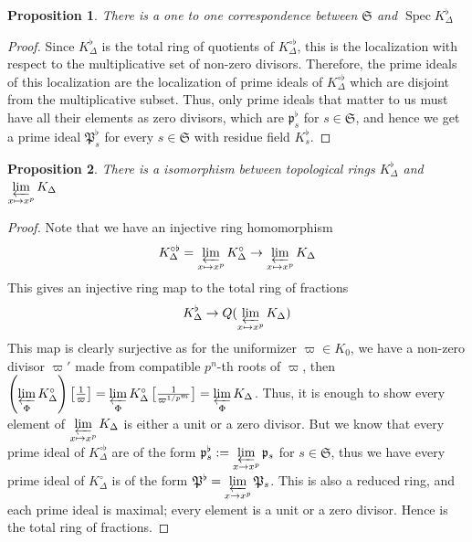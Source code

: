 \documentclass[12pts,a4paper]{amsart}
\newtheorem{proposition}{Proposition}[section]
\DeclareMathOperator{\spec}{Spec}
\begin{document}
\begin{proposition}
    There is a one to one correspondence between $\mathfrak{S}$ and $\spec K^\flat_\Delta$
\end{proposition}

\begin{proof}
    Since $K^\flat_\Delta$ is the total ring of quotients of $K^{\circ\flat}_\Delta$, this is the localization with respect to the multiplicative set of non-zero divisors. Therefore, the prime ideals of this localization are the localization of prime ideals of $K^{\circ\flat}_\Delta$ which are disjoint from the multiplicative subset. Thus, only prime ideals that matter to us must have all their elements as zero divisors, which are $\mathfrak{p}^\flat_s$ for $s\in\mathfrak{S}$, and hence we get a prime ideal  $\mathfrak{P}^\flat_s$ for every $s\in\mathfrak{S}$ with residue field $K^\flat_s$.
\end{proof}

\begin{proposition}
	There is a isomorphism between topological rings $K^\flat_\Delta$ and $\varprojlim\limits_{x\mapsto x^p} K_\Delta$
\end{proposition}

\begin{proof}
     Note that we have an injective ring homomorphism
     \begin{align*}
     	K^{\circ\flat}_\Delta=\varprojlim\limits_{x\mapsto x^p}K^{\circ}_\Delta\to \varprojlim\limits_{x\mapsto x^p}K_\Delta
     \end{align*}
     This gives an injective ring map to the total ring of fractions
     \begin{align*}
     	K^\flat_\Delta\to Q(\varprojlim\limits_{x\mapsto x^p}K_\Delta)
     \end{align*}
     This map is clearly surjective as for the uniformizer $\varpi\in K_0$, we have a non-zero divisor $\varpi'$ made from compatible $p^n$-th roots of $\varpi$, then $\left(\varprojlim\limits_{\Phi}K^\circ_\Delta\right)\left[\frac{1}{\varpi}\right]=\varprojlim\limits_{\Phi} K^\circ_{\Delta}\left[\frac{1}{\varpi^{1/p^m}}\right]=\varprojlim\limits_\Phi K_\Delta$.
     Thus, it is enough to show every element of $\varprojlim\limits_{x\mapsto x^p}K_\Delta$ is either a unit or a zero divisor.  But we know that every prime ideal of $K^{\circ\flat}_\Delta$ are of the form $\mathfrak{p}^\flat_s:=\varprojlim\limits_{x\to x^p}\mathfrak{p}_s$ for $s\in\mathfrak{S}$, thus we have every prime ideal of $K^\circ_\Delta$ is of the form $\mathfrak{P}^\flat=\varprojlim\limits_{x\to x^p}\mathfrak{P}_s$. This is also a reduced ring, and each prime ideal is maximal; every element is a unit or a zero divisor. Hence is the total ring of fractions.
\end{proof}
\end{document}
